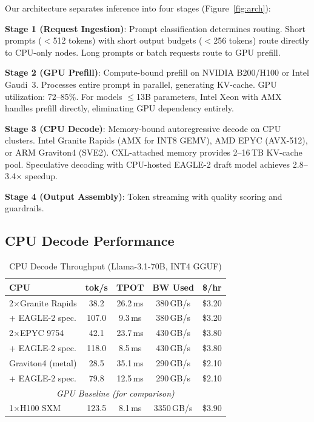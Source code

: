 \documentclass[conference,10pt]{IEEEtran}
\begin{document}
Our architecture separates inference into four stages (Figure~\ref{fig:arch}):

\textbf{Stage 1 (Request Ingestion)}: Prompt classification determines routing. Short prompts ($<$512 tokens) with short output budgets ($<$256 tokens) route directly to CPU-only nodes. Long prompts or batch requests route to GPU prefill.

\textbf{Stage 2 (GPU Prefill)}: Compute-bound prefill on NVIDIA B200/H100 or Intel Gaudi~3. Processes entire prompt in parallel, generating KV-cache. GPU utilization: 72--85\%. For models $\leq$13B parameters, Intel Xeon with AMX handles prefill directly, eliminating GPU dependency entirely.

\textbf{Stage 3 (CPU Decode)}: Memory-bound autoregressive decode on CPU clusters. Intel Granite Rapids (AMX for INT8 GEMV), AMD EPYC (AVX-512), or ARM Graviton4 (SVE2). CXL-attached memory provides 2--16\,TB KV-cache pool. Speculative decoding with CPU-hosted EAGLE-2 draft model achieves 2.8--3.4$\times$ speedup.

\textbf{Stage 4 (Output Assembly)}: Token streaming with quality scoring and guardrails.

\subsection{CPU Decode Performance}

\begin{table}[!htbp]
\caption{CPU Decode Throughput (Llama-3.1-70B, INT4 GGUF)}
\label{tab:cpudecode}
\centering\footnotesize
\begin{tabular}{@{}lcccc@{}}
\toprule
\textbf{CPU} & \textbf{tok/s} & \textbf{TPOT} & \textbf{BW Used} & \textbf{\$/hr} \\
\midrule
2$\times$Granite Rapids & 38.2 & 26.2\,ms & 380\,GB/s & \$3.20 \\
\quad + EAGLE-2 spec. & 107.0 & 9.3\,ms & 380\,GB/s & \$3.20 \\
2$\times$EPYC 9754 & 42.1 & 23.7\,ms & 430\,GB/s & \$3.80 \\
\quad + EAGLE-2 spec. & 118.0 & 8.5\,ms & 430\,GB/s & \$3.80 \\
Graviton4 (metal) & 28.5 & 35.1\,ms & 290\,GB/s & \$2.10 \\
\quad + EAGLE-2 spec. & 79.8 & 12.5\,ms & 290\,GB/s & \$2.10 \\
\midrule
\multicolumn{5}{c}{\textit{GPU Baseline (for comparison)}} \\
\midrule
1$\times$H100 SXM & 123.5 & 8.1\,ms & 3350\,GB/s & \$3.90 \\
\bottomrule
\end{tabular}
\end{table}
\end{document}
